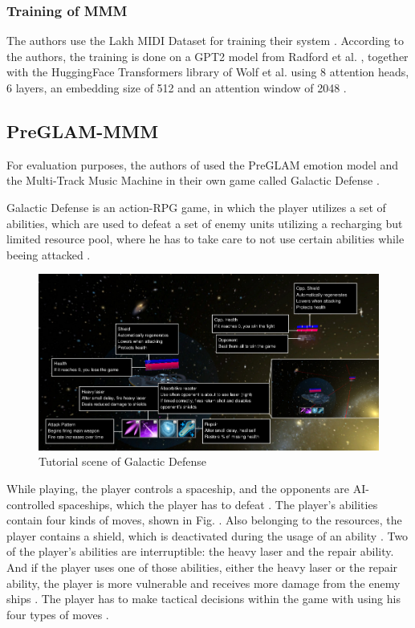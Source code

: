 \subsubsection{Training of MMM}

The authors use the Lakh MIDI Dataset \cite{raffel2016learning} for training their system \cite{ens2020mmm}. According to the authors, the training is done on a GPT2 model from 
Radford et al. \cite{radford2019language}, together with the HuggingFace Transformers
library of Wolf et al. \cite{wolf2019huggingface} using 8 attention heads, 6 layers, an
embedding size of 512 and an attention window of 2048 \cite{ens2020mmm}.

\subsection{PreGLAM-MMM}

For evaluation purposes, the authors of \cite{plut2022preglam} used the PreGLAM
emotion model \cite{plut2023preglam} and the Multi-Track Music 
Machine \cite{ens2020mmm} in their own game called Galactic Defense \cite{plut2022preglam}.


Galactic Defense is an action-RPG game, in which the player utilizes a set of
abilities, which are used to defeat a set of enemy units 
utilizing a recharging but limited resource pool, where he has 
to take care to not use certain abilities while beeing attacked \cite{plut2022preglam}.

\begin{figure}[h]
    \centering
    \includegraphics[width=\linewidth]{images/tutorial_gal_def.png}
    \caption{Tutorial scene of Galactic Defense \cite{plut2022preglam}}
    \label{fig:tutorial_gal_def}
\end{figure}

While playing, the player controls a spaceship, and the opponents
are AI-controlled spaceships, which the player has to defeat \cite{plut2022preglam}. The player's abilities contain four kinds of 
moves, shown in Fig.  \cite{plut2022preglam}.
Also belonging to the resources, the player contains a shield, which is 
deactivated during the usage of an ability \cite{plut2022preglam}. Two of the 
player’s abilities are interruptible: the heavy laser and the repair ability. 
And if the player uses one of those abilities, either the heavy laser
or the repair ability, the player is more vulnerable and receives more 
damage from the enemy ships \cite{plut2022preglam}.
The player has to make tactical decisions within the game with
using his four types of moves \cite{plut2022preglam}.

